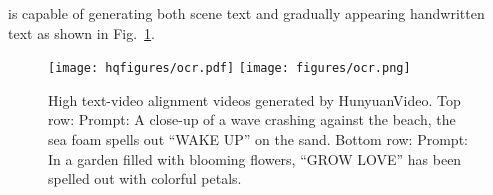 \nameofmethod{} is capable of generating both scene text and gradually appearing handwritten text as shown in Fig.~\ref{fig:ocr}. 



\begin{figure}[!htbp]
    \centering
    \ifhq
    \texttt{[image: hqfigures/ocr.pdf]}
    \else
    \texttt{[image: figures/ocr.png]}
    \fi
    \caption{High text-video alignment videos generated by HunyuanVideo. Top row: Prompt: A close-up of a wave crashing against the beach, the sea foam spells out ``WAKE UP'' on the sand. Bottom row: Prompt: In a garden filled with blooming flowers, ``GROW LOVE'' has been spelled out with colorful petals.}
    \label{fig:ocr}
\end{figure}



